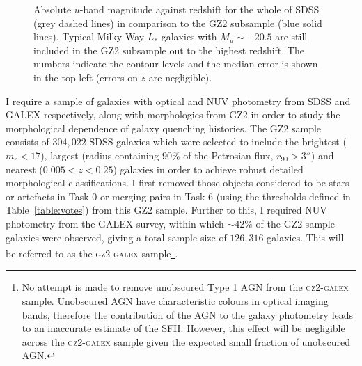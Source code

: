 \begin{figure}[t]
\caption[GZ2-GALEX sample completeness]{Absolute $u$-band magnitude against redshift for the whole of SDSS (grey dashed lines) in comparison to the GZ2 subsample (blue solid lines). Typical Milky Way $L_*$ galaxies with $M_u \sim -20.5$ are still included in the GZ2 subsample out to the highest redshift. {\minor The numbers indicate the contour levels and the median error is shown in the top left (errors on $z$ are negligible).}}
\label{complete}
\end{figure}


I require a sample of galaxies with optical and NUV photometry from SDSS and GALEX respectively, along with morphologies from GZ2 in order to study the morphological dependence of galaxy quenching histories. The GZ2 sample consists of $304,022$ SDSS galaxies which were selected to include the brightest ($m_r < 17$), largest (radius containing $90\%$ of the Petrosian flux, $r_{90} > 3''$) and nearest ($0.005 < z < 0.25$) galaxies in order to achieve robust detailed morphological classifications. I first removed those objects considered to be stars or artefacts in Task 0 or merging pairs in Task 6 (using the thresholds defined in Table~\ref{table:votes}) from this GZ2 sample. Further to this, I required NUV photometry from the GALEX survey, within which $\sim42\%$ of the GZ2 sample galaxies were observed, giving a total sample size of $126, 316$ galaxies. This will be referred to as the \textsc{gz2-galex} sample\footnote{No attempt is made to remove unobscured Type 1 AGN from the \textsc{gz2-galex} sample. Unobscured AGN have characteristic colours in optical imaging bands, therefore the contribution of the AGN to the galaxy photometry leads to an inaccurate estimate of the SFH. However, this effect will be negligible across the \textsc{gz2-galex} sample given the expected small fraction of unobscured AGN.}. 

